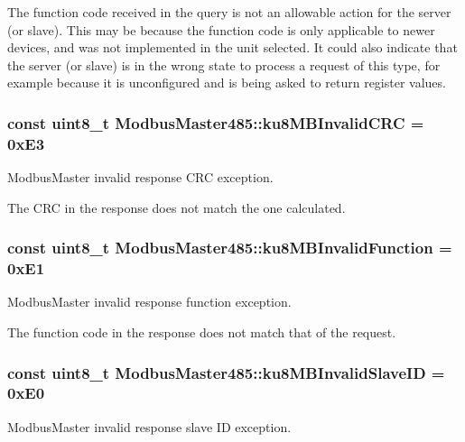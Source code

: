 The function code received in the query is not an allowable action for the server (or slave). This may be because the function code is only applicable to newer devices, and was not implemented in the unit selected. It could also indicate that the server (or slave) is in the wrong state to process a request of this type, for example because it is unconfigured and is being asked to return register values. 
\subsubsection[{\texorpdfstring{ku8\+M\+B\+Invalid\+C\+RC}{ku8MBInvalidCRC}}]{\setlength{\rightskip}{0pt plus 5cm}const uint8\+\_\+t Modbus\+Master485\+::ku8\+M\+B\+Invalid\+C\+RC = 0x\+E3\hspace{0.3cm}{\ttfamily [static]}}\hypertarget{class_modbus_master485_a4b903c24f9893f0f3cd045e1d0b6cdeb}{}\label{class_modbus_master485_a4b903c24f9893f0f3cd045e1d0b6cdeb}
Modbus\+Master invalid response C\+RC exception.

The C\+RC in the response does not match the one calculated. 
\subsubsection[{\texorpdfstring{ku8\+M\+B\+Invalid\+Function}{ku8MBInvalidFunction}}]{\setlength{\rightskip}{0pt plus 5cm}const uint8\+\_\+t Modbus\+Master485\+::ku8\+M\+B\+Invalid\+Function = 0x\+E1\hspace{0.3cm}{\ttfamily [static]}}\hypertarget{class_modbus_master485_a0cef4e3625e700c5893a6f2566740d20}{}\label{class_modbus_master485_a0cef4e3625e700c5893a6f2566740d20}
Modbus\+Master invalid response function exception.

The function code in the response does not match that of the request. 
\subsubsection[{\texorpdfstring{ku8\+M\+B\+Invalid\+Slave\+ID}{ku8MBInvalidSlaveID}}]{\setlength{\rightskip}{0pt plus 5cm}const uint8\+\_\+t Modbus\+Master485\+::ku8\+M\+B\+Invalid\+Slave\+ID = 0x\+E0\hspace{0.3cm}{\ttfamily [static]}}\hypertarget{class_modbus_master485_a8c6645d913b0149ebb97ecba35d0a99d}{}\label{class_modbus_master485_a8c6645d913b0149ebb97ecba35d0a99d}
Modbus\+Master invalid response slave ID exception.

